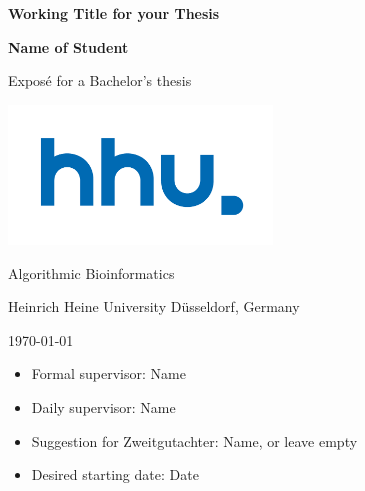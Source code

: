 \documentclass[a4paper,11pt]{article}
\begin{document}
\begin{center}
    \vspace*{1cm}

    {\Huge\bfseries Working Title for your Thesis\par}

    \vspace{1.5cm}

    {\Large\bfseries Name of Student\par}

    \vspace{1.5cm}

    {\Large Exposé for a Bachelor's thesis\par}

    \vspace{1.5cm}

    \includegraphics[width=7cm]{fig/hhu.pdf}

    \vspace{0.5cm}

    {\large
        Algorithmic Bioinformatics \par
        Heinrich Heine University Düsseldorf, Germany \par
        \today \par
    }

    \vspace{1cm}
\end{center}

\begin{itemize}[leftmargin=2cm, labelsep=0.5em, before=\large]
    \item Formal supervisor: Name
    \item Daily supervisor: Name
    \item Suggestion for Zweitgutachter: Name, or leave empty
    \item Desired starting date: Date
\end{itemize}

\vspace{2cm}

\clearpage

\setcounter{page}{2}
\pagestyle{plain}
\end{document}

